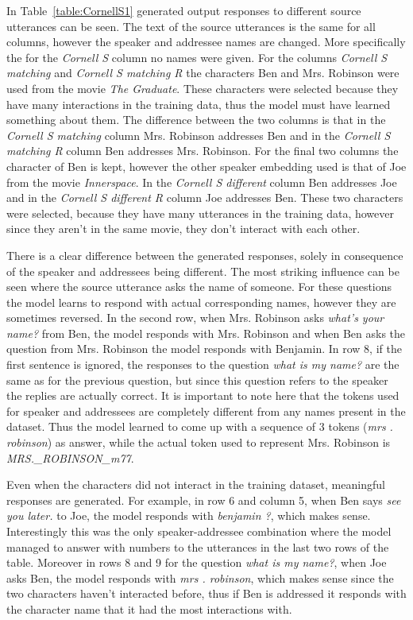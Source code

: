 \documentclass[12pt]{article}
\begin{document}
In Table~\ref{table:CornellS1} generated output responses to different source utterances can be seen. The text of the source utterances is the same for all columns, however the speaker and addressee names are changed. More specifically the for the \textit{Cornell S} column no names were given. For the columns \textit{Cornell S matching} and \textit{Cornell S matching R} the characters Ben and Mrs. Robinson were used from the movie \textit{The Graduate}. These characters were selected because they have many interactions in the training data, thus the model must have learned something about them. The difference between the two columns is that in the \textit{Cornell S matching} column Mrs. Robinson addresses Ben and in the \textit{Cornell S matching R} column Ben addresses Mrs. Robinson. For the final two columns the character of Ben is kept, however the other speaker embedding used is that of Joe from the movie \textit{Innerspace}. In the \textit{Cornell S different} column Ben addresses Joe and in the \textit{Cornell S different R} column Joe addresses Ben. These two characters were selected, because they have many utterances in the training data, however since they aren't in the same movie, they don't interact with each other.

There is a clear difference between the generated responses, solely in consequence of the speaker and addressees being different. The most striking influence can be seen where the source utterance asks the name of someone. For these questions the model learns to respond with actual corresponding names, however they are sometimes reversed. In the second row, when Mrs. Robinson asks \textit{what's your name?} from Ben, the model responds with Mrs. Robinson and when Ben asks the question from Mrs. Robinson the model responds with Benjamin. In row 8, if the first sentence is ignored, the responses to the question \textit{what is my name?} are the same as for the previous question, but since this question refers to the speaker the replies are actually correct. It is important to note here that the tokens used for speaker and addressees are completely different from any names present in the dataset. Thus the model learned to come up with a sequence of 3 tokens (\textit{mrs . robinson}) as answer, while the actual token used to represent Mrs. Robinson is \textit{MRS.\_ROBINSON\_m77}.

Even when the characters did not interact in the training dataset, meaningful responses are generated. For example, in row 6 and column 5, when Ben says \textit{see you later.} to Joe, the model responds with \textit{benjamin ?}, which makes sense. Interestingly this was the only speaker-addressee combination where the model managed to answer with numbers to the utterances in the last two rows of the table. Moreover in rows 8 and 9 for the question \textit{what is my name?}, when Joe asks Ben, the model responds with \textit{mrs . robinson}, which makes sense since the two characters haven't interacted before, thus if Ben is addressed it responds with the character name that it had the most interactions with.
\end{document}
